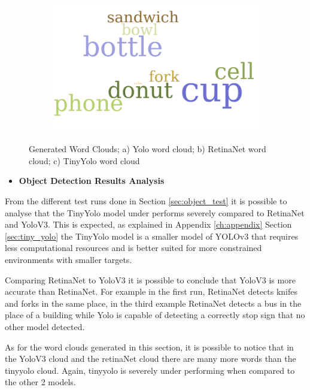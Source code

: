 \begin{figure}[H]
      \begin{subfigure}{0.3\textwidth}
      \includegraphics[width=\textwidth]{Sections/4InitialWork/4_images_wordcloud/tiny_yolo_pic.png}\hfill
      \caption{}
      \end{subfigure}
      \caption[Generated Word Clouds]{Generated Word Clouds; a) Yolo word cloud; b) RetinaNet word cloud; c) TinyYolo word cloud}
    \end{figure}

    \newpage
    
    \begin{itemize}
      \item \textbf{Object Detection Results Analysis}
    \end{itemize}

    

     From the different test runs done in Section \ref{sec:object_test} it is possible to analyse that the TinyYolo model under performs severely compared to RetinaNet and YoloV3. This is expected, as explained in Appendix \ref{ch:appendix} Section \ref{sec:tiny_yolo} the TinyYolo model is a smaller model of YOLOv3 that requires less computational resources and is better suited for more constrained environments with smaller targets.

     Comparing RetinaNet to YoloV3 it is possible to conclude that YoloV3 is more accurate than RetinaNet. For example in the first run, RetinaNet detects knifes and forks in the same place, in the third example RetinaNet detects a bus in the place of a building while Yolo is capable of detecting a correctly stop sign that no other model detected.

     As for the word clouds generated in this section, it is possible to notice that in the YoloV3 cloud and the retinaNet cloud there are many more words than the tinyyolo cloud. Again, tinyyolo is severely under performing when compared to the other 2 models.
     
